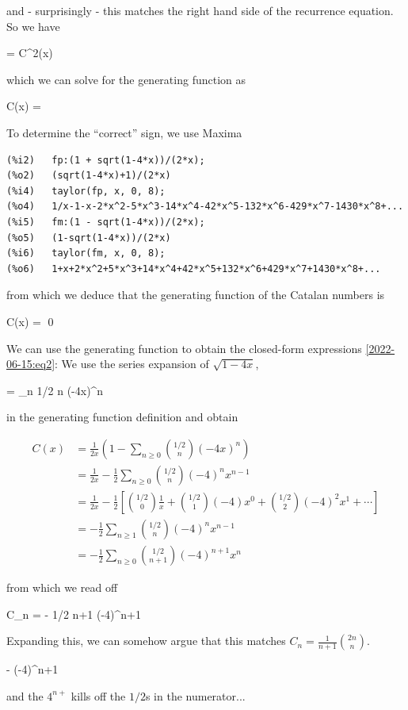 and - surprisingly - this matches the right hand side of the recurrence equation. So we have

\bee
{} = C^2(x)
\eee

which we can solve for the generating function as

\bee
C(x) = 
\eee

To determine the ``correct'' sign, we use Maxima

\begin{verbatim}
(%i2)	fp:(1 + sqrt(1-4*x))/(2*x);
(%o2)	(sqrt(1-4*x)+1)/(2*x)
(%i4)	taylor(fp, x, 0, 8);
(%o4)	1/x-1-x-2*x^2-5*x^3-14*x^4-42*x^5-132*x^6-429*x^7-1430*x^8+...
(%i5)	fm:(1 - sqrt(1-4*x))/(2*x);
(%o5)	(1-sqrt(1-4*x))/(2*x)
(%i6)	taylor(fm, x, 0, 8);
(%o6)	1+x+2*x^2+5*x^3+14*x^4+42*x^5+132*x^6+429*x^7+1430*x^8+...
\end{verbatim}

from which we deduce that the generating function of the Catalan numbers is

\bee
C(x) =  \qed
\eee

We can use the generating function to obtain the closed-form expressions \eqref{2022-06-15:eq2}: We use the series expansion of $\sqrt{1-4x}$,

\bee
{} = \sum_{n } {1/2 \choose n} (-4x)^n
\eee

in the generating function definition and obtain

\begin{align*}
  C(x) &= \frac{1}{2x} \left( 1 - \sum_{n \geq 0} {1/2 \choose n} (-4x)^n \right) \\
       &= \frac{1}{2x} - \frac{1}{2} \sum_{n \geq 0} {1/2 \choose n} (-4)^n x^{n-1} \\
       &= \frac{1}{2x} - \frac{1}{2} \left[ {1/2 \choose 0} \frac{1}{x} + {1/2 \choose 1} (-4)x^0 + {1/2 \choose 2} (-4)^2 x^1 + \cdots \right] \\
       &= -\frac{1}{2} \sum_{n \geq 1} {1/2 \choose n} (-4)^n x^{n-1} \\
       &= - \frac{1}{2} \sum_{n \geq 0} {1/2 \choose n+1} (-4)^{n+1} x^{n}
\end{align*}

from which we read off

\bee
C_n = -  {1/2 \choose n+1} (-4)^{n+1}
\eee

Expanding this, we can somehow argue that this matches $C_n = \frac{1}{n+1} {2n \choose n}$. 

\bee
 -   (-4)^{n+1} 
 \eee

 and the $4^{n+}$ kills off the $1/2$s in the numerator...

